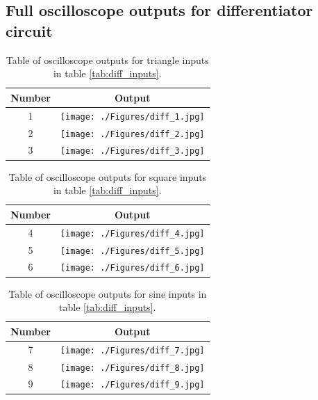 \documentclass[11pt]{article}
\begin{document}
\subsection{Full oscilloscope outputs for differentiator circuit}
\begin{table}[H]
	\centering
	\begin{tabular}{|c|c|}
		\hline
		Number	& Output\\
		\hline
		1		& \texttt{[image: ./Figures/diff\_1.jpg]} \\
		\hline
		2		& \texttt{[image: ./Figures/diff\_2.jpg]} \\
		\hline
		3		& \texttt{[image: ./Figures/diff\_3.jpg]} \\
		\hline
	\end{tabular}
	\caption{
		Table of oscilloscope outputs for triangle inputs in table 
		\ref{tab:diff_inputs}.
	}
	\label{tab:diff_output_triangle}
\end{table}

\begin{table}[H]
	\centering
	\begin{tabular}{|c|c|}
		\hline
		Number	& Output\\
		\hline
		4		& \texttt{[image: ./Figures/diff\_4.jpg]} \\
		\hline
		5		& \texttt{[image: ./Figures/diff\_5.jpg]} \\
		\hline
		6		& \texttt{[image: ./Figures/diff\_6.jpg]} \\
		\hline
	\end{tabular}
	\caption{
		Table of oscilloscope outputs for square inputs in table 
		\ref{tab:diff_inputs}.
	}
	\label{tab:diff_output_square}
\end{table}

\begin{table}[H]
	\centering
	\begin{tabular}{|c|c|}
		\hline
		Number	& Output\\
		\hline
		7		& \texttt{[image: ./Figures/diff\_7.jpg]} \\
		\hline
		8		& \texttt{[image: ./Figures/diff\_8.jpg]} \\
		\hline
		9		& \texttt{[image: ./Figures/diff\_9.jpg]} \\
		\hline
	\end{tabular}
	\caption{
		Table of oscilloscope outputs for sine inputs in table 
		\ref{tab:diff_inputs}.
	}
	\label{tab:diff_output_sine}
\end{table}
\end{document}
